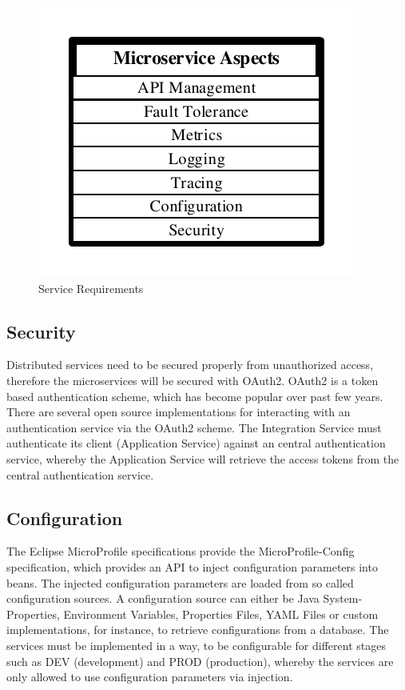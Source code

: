 \begin{figure}[htbp]
	\centering
	\includegraphics[scale=1]{images/esboc-requirement-services.pdf}
	\caption{Service Requirements}
	\label{fig:esboc-aspects}
\end{figure} 


\subsection{Security}
\label{sec:esboc-aspects-security}
Distributed services need to be secured properly from unauthorized access, therefore the microservices will be secured with OAuth2. OAuth2 is a token based authentication scheme, which has become popular over past few years. There are several open source implementations for interacting with an authentication service via the OAuth2 scheme. The Integration Service must authenticate its client (Application Service) against an central authentication service, whereby the Application Service will retrieve the access tokens from the central authentication service\cite{OAuth2018}.

\subsection{Configuration}
\label{sec:esboc-aspects-config}
The Eclipse MicroProfile specifications provide the MicroProfile-Config specification, which provides an API to inject configuration parameters into beans. The injected configuration parameters are loaded from so called configuration sources. A configuration source can either be Java System-Properties, Environment Variables, Properties Files, YAML Files or custom implementations, for instance, to retrieve configurations from a database. The services must be implemented in a way, to be configurable for different stages such as DEV (development) and PROD (production), whereby  the services are only allowed to use configuration parameters via injection\cite{EclipseMicroprofileConfig2018}.

